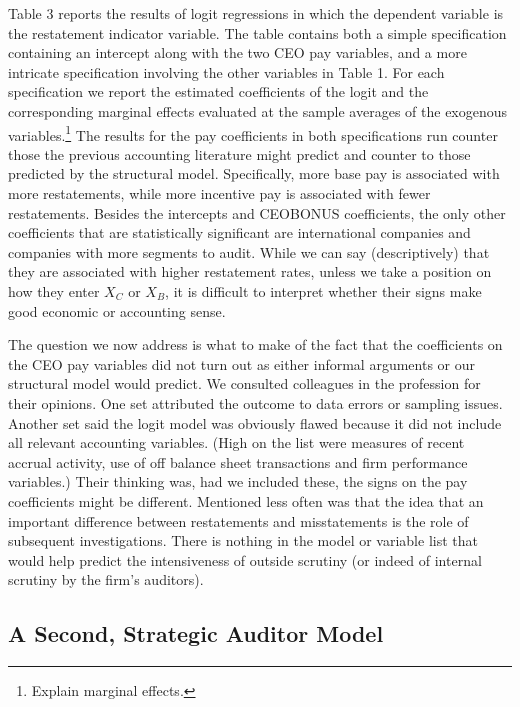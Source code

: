 \documentclass[14pt]{article}
\begin{document}
Table 3 reports the results of logit regressions in which the dependent
variable is the restatement indicator variable. The table contains both a simple 
specification containing an intercept along with the two CEO pay variables, 
and a more intricate specification involving the other variables in Table 1.
For each specification we report the estimated coefficients of the logit and the 
corresponding marginal effects evaluated at the sample averages of the exogenous
variables.\footnote{Explain marginal effects.} The results for the pay coefficients
in both specifications run counter those the previous accounting literature might
predict and counter to those predicted by the structural model.
Specifically,  more base pay is associated with more
restatements, while more incentive pay is associated with fewer restatements.
Besides the intercepts and CEOBONUS coefficients, the only other coefficients 
that are statistically significant are international companies and companies with 
more segments to audit. While we can say (descriptively) that they are associated
with higher restatement rates, unless we take a position on how they enter
 $X_C$ or $X_B$, it is difficult to interpret whether their signs make good economic
or accounting sense.

The question we now address is what to make of the fact that the coefficients
on the CEO pay variables did not turn out as either informal arguments or our
structural model would predict. We consulted colleagues in the
profession for their opinions. One set attributed the outcome to data errors
or sampling issues. Another set said the logit model was obviously flawed because
it did not include all relevant accounting variables. (High on the list were measures
of recent accrual activity, use of off balance sheet transactions and firm
performance variables.) Their thinking was, had we included these, the signs
on the pay coefficients might be different. Mentioned less often was that the idea
that an important difference between restatements and misstatements is the role of subsequent
investigations. There is nothing in the model or variable list that would help predict 
the intensiveness of outside scrutiny (or indeed of internal scrutiny by the firm's auditors).

\subsection{A Second, Strategic Auditor Model}
\end{document}
